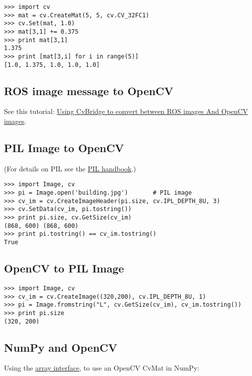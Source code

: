 \begin{lstlisting}
>>> import cv
>>> mat = cv.CreateMat(5, 5, cv.CV_32FC1)
>>> cv.Set(mat, 1.0)
>>> mat[3,1] += 0.375
>>> print mat[3,1]
1.375
>>> print [mat[3,i] for i in range(5)]
[1.0, 1.375, 1.0, 1.0, 1.0]
\end{lstlisting}

\subsection{ROS image message to OpenCV}

See this tutorial: \href{http://www.ros.org/wiki/cv\_bridge/Tutorials/UsingCvBridgeToConvertBetweenROSImagesAndOpenCVImages}{Using CvBridge to convert between ROS images And OpenCV images}.

\subsection{PIL Image to OpenCV}

(For details on PIL see the \href{http://www.pythonware.com/library/pil/handbook/image.htm}{PIL handbook}.)

\begin{lstlisting}
>>> import Image, cv
>>> pi = Image.open('building.jpg')       # PIL image
>>> cv_im = cv.CreateImageHeader(pi.size, cv.IPL_DEPTH_8U, 3)
>>> cv.SetData(cv_im, pi.tostring())
>>> print pi.size, cv.GetSize(cv_im)
(868, 600) (868, 600)
>>> print pi.tostring() == cv_im.tostring()
True
\end{lstlisting}

\subsection{OpenCV to PIL Image}

\begin{lstlisting}
>>> import Image, cv
>>> cv_im = cv.CreateImage((320,200), cv.IPL_DEPTH_8U, 1)
>>> pi = Image.fromstring("L", cv.GetSize(cv_im), cv_im.tostring())
>>> print pi.size
(320, 200)
\end{lstlisting}

\subsection{NumPy and OpenCV}

Using the \href{http://docs.scipy.org/doc/numpy/reference/arrays.interface.html}{array interface}, to use an OpenCV CvMat in NumPy:

